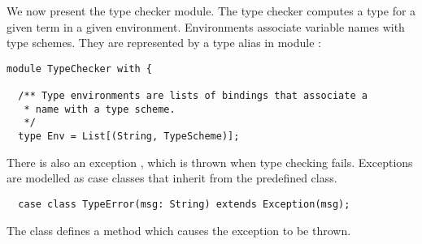 \documentclass[11pt]{report}
\begin{document}
We now present the type checker module. The type checker
computes a type for a given term in a given environment. Environments
associate variable names with type schemes. They are represented by a
type alias \verb@Env@ in module \verb@TypeChecker@:
\begin{verbatim}
module TypeChecker with {

  /** Type environments are lists of bindings that associate a
   * name with a type scheme.
   */
  type Env = List[(String, TypeScheme)];
\end{verbatim}
There is also an exception \verb@TypeError@, which is thrown when type
checking fails. Exceptions are modelled as case classes that inherit
from the predefined \verb@Exception@ class.
\begin{verbatim}
  case class TypeError(msg: String) extends Exception(msg);
\end{verbatim}
The \verb@Exception@ class defines a \verb@throw@ method which causes
the exception to be thrown.
\end{document}
